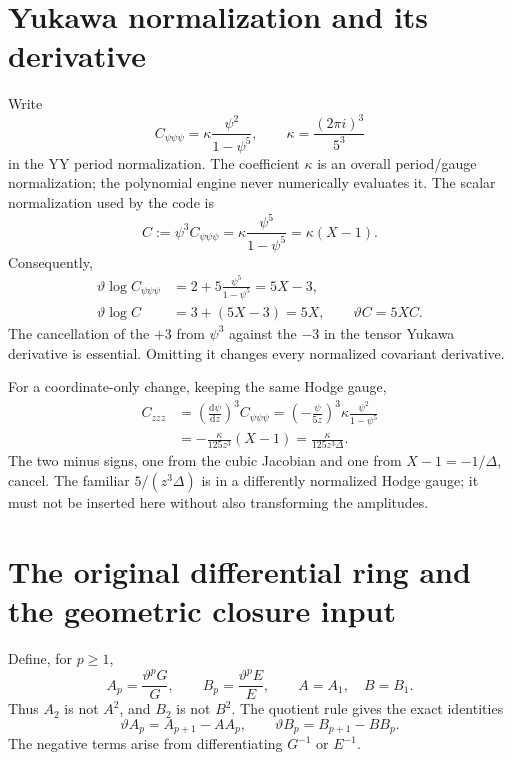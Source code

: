 \documentclass[11pt,a4paper]{article}
\numberwithin{equation}{section}
\newcommand{\dd}{\mathrm d}
\newcommand{\tht}{\vartheta}
\begin{document}
\section{Yukawa normalization and its derivative}

Write
\begin{equation}
C_{\psi\psi\psi}=\kappa\frac{\psi^2}{1-\psi^5},\qquad
\kappa=\frac{(2\pi i)^3}{5^3}
\end{equation}
in the YY period normalization. The coefficient $\kappa$ is an overall
period/gauge normalization; the polynomial engine never numerically
evaluates it. The scalar normalization used by the code is
\begin{equation}
C:=\psi^3C_{\psi\psi\psi}
 =\kappa\frac{\psi^5}{1-\psi^5}=\kappa(X-1).
\end{equation}
Consequently,
\begin{align}
\tht\log C_{\psi\psi\psi}
 &=2+5\frac{\psi^5}{1-\psi^5}=5X-3,\\
\tht\log C&=3+(5X-3)=5X,\qquad \tht C=5XC.
\label{eq:thetaC}
\end{align}
The cancellation of the $+3$ from $\psi^3$ against the $-3$ in the tensor
Yukawa derivative is essential. Omitting it changes every normalized
covariant derivative.

For a coordinate-only change, keeping the same Hodge gauge,
\begin{align}
C_{zzz}&=\left(\frac{\dd\psi}{\dd z}\right)^3 C_{\psi\psi\psi}
 =\left(-\frac{\psi}{5z}\right)^3
       \kappa\frac{\psi^2}{1-\psi^5}\\
 &=-\frac{\kappa}{125z^3}(X-1)
  =\frac{\kappa}{125z^3\Delta}.
\end{align}
The two minus signs, one from the cubic Jacobian and one from
$X-1=-1/\Delta$, cancel. The familiar $5/(z^3\Delta)$ is in a differently
normalized Hodge gauge; it must not be inserted here without also transforming
the amplitudes.

\section{The original differential ring and the geometric closure input}

Define, for $p\ge1$,
\begin{equation}
A_p=\frac{\tht^p G}{G},\qquad
B_p=\frac{\tht^p E}{E},\qquad A=A_1,\quad B=B_1.
\end{equation}
Thus $A_2$ is not $A^2$, and $B_2$ is not $B^2$.
The quotient rule gives the exact identities
\begin{equation}
\tht A_p=A_{p+1}-AA_p,\qquad
\tht B_p=B_{p+1}-BB_p.
\label{eq:quotient}
\end{equation}
The negative terms arise from differentiating $G^{-1}$ or $E^{-1}$.
\end{document}
